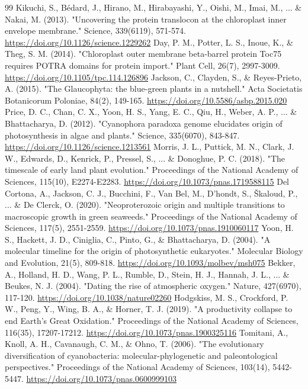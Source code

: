 \documentclass[10pt,letterpaper]{article}
\begin{document}
\begin{thebibliography}{99}
 Kikuchi, S., Bédard, J., Hirano, M., Hirabayashi, Y., Oishi, M., Imai, M., ... \& Nakai, M. (2013). "Uncovering the protein translocon at the chloroplast inner envelope membrane." Science, 339(6119), 571-574. \url{https://doi.org/10.1126/science.1229262}
 Day, P. M., Potter, L. S., Inoue, K., \& Theg, S. M. (2014). "Chloroplast outer membrane beta-barrel protein Toc75 requires POTRA domains for protein import." Plant Cell, 26(7), 2997-3009. \url{https://doi.org/10.1105/tpc.114.126896}
 Jackson, C., Clayden, S., \& Reyes-Prieto, A. (2015). "The Glaucophyta: the blue-green plants in a nutshell." Acta Societatis Botanicorum Poloniae, 84(2), 149-165. \url{https://doi.org/10.5586/asbp.2015.020}
 Price, D. C., Chan, C. X., Yoon, H. S., Yang, E. C., Qiu, H., Weber, A. P., ... \& Bhattacharya, D. (2012). "Cyanophora paradoxa genome elucidates origin of photosynthesis in algae and plants." Science, 335(6070), 843-847. \url{https://doi.org/10.1126/science.1213561}
 Morris, J. L., Puttick, M. N., Clark, J. W., Edwards, D., Kenrick, P., Pressel, S., ... \& Donoghue, P. C. (2018). "The timescale of early land plant evolution." Proceedings of the National Academy of Sciences, 115(10), E2274-E2283. \url{https://doi.org/10.1073/pnas.1719588115}
 Del Cortona, A., Jackson, C. J., Bucchini, F., Van Bel, M., D’hondt, S., Škaloud, P., ... \& De Clerck, O. (2020). "Neoproterozoic origin and multiple transitions to macroscopic growth in green seaweeds." Proceedings of the National Academy of Sciences, 117(5), 2551-2559. \url{https://doi.org/10.1073/pnas.1910060117}
 Yoon, H. S., Hackett, J. D., Ciniglia, C., Pinto, G., \& Bhattacharya, D. (2004). "A molecular timeline for the origin of photosynthetic eukaryotes." Molecular Biology and Evolution, 21(5), 809-818. \url{https://doi.org/10.1093/molbev/msh075}
 Bekker, A., Holland, H. D., Wang, P. L., Rumble, D., Stein, H. J., Hannah, J. L., ... \& Beukes, N. J. (2004). "Dating the rise of atmospheric oxygen." Nature, 427(6970), 117-120. \url{https://doi.org/10.1038/nature02260}
 Hodgskiss, M. S., Crockford, P. W., Peng, Y., Wing, B. A., \& Horner, T. J. (2019). "A productivity collapse to end Earth’s Great Oxidation." Proceedings of the National Academy of Sciences, 116(35), 17207-17212. \url{https://doi.org/10.1073/pnas.1900325116}
 Tomitani, A., Knoll, A. H., Cavanaugh, C. M., \& Ohno, T. (2006). "The evolutionary diversification of cyanobacteria: molecular-phylogenetic and paleontological perspectives." Proceedings of the National Academy of Sciences, 103(14), 5442-5447. \url{https://doi.org/10.1073/pnas.0600999103}

\end{thebibliography}
\end{document}
